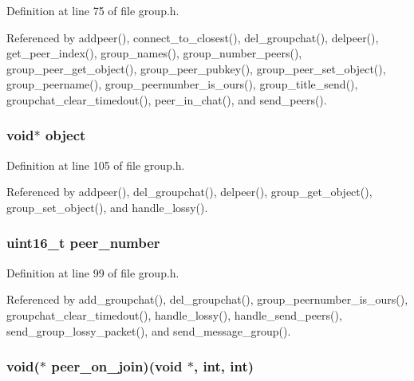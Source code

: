 Definition at line 75 of file group.\+h.



Referenced by addpeer(), connect\+\_\+to\+\_\+closest(), del\+\_\+groupchat(), delpeer(), get\+\_\+peer\+\_\+index(), group\+\_\+names(), group\+\_\+number\+\_\+peers(), group\+\_\+peer\+\_\+get\+\_\+object(), group\+\_\+peer\+\_\+pubkey(), group\+\_\+peer\+\_\+set\+\_\+object(), group\+\_\+peername(), group\+\_\+peernumber\+\_\+is\+\_\+ours(), group\+\_\+title\+\_\+send(), groupchat\+\_\+clear\+\_\+timedout(), peer\+\_\+in\+\_\+chat(), and send\+\_\+peers().

\hypertarget{struct_group__c_a077376d12464f945e2414d5499c79b3f}{
\subsubsection[{object}]{\setlength{\rightskip}{0pt plus 5cm}void$\ast$ object}}\label{struct_group__c_a077376d12464f945e2414d5499c79b3f}


Definition at line 105 of file group.\+h.



Referenced by addpeer(), del\+\_\+groupchat(), delpeer(), group\+\_\+get\+\_\+object(), group\+\_\+set\+\_\+object(), and handle\+\_\+lossy().

\hypertarget{struct_group__c_a264348ec1f724e05464ca97b7c432817}{
\subsubsection[{peer\+\_\+number}]{\setlength{\rightskip}{0pt plus 5cm}uint16\+\_\+t peer\+\_\+number}}\label{struct_group__c_a264348ec1f724e05464ca97b7c432817}


Definition at line 99 of file group.\+h.



Referenced by add\+\_\+groupchat(), del\+\_\+groupchat(), group\+\_\+peernumber\+\_\+is\+\_\+ours(), groupchat\+\_\+clear\+\_\+timedout(), handle\+\_\+lossy(), handle\+\_\+send\+\_\+peers(), send\+\_\+group\+\_\+lossy\+\_\+packet(), and send\+\_\+message\+\_\+group().

\hypertarget{struct_group__c_a218cd2e97bdb682b90f72faa6eb08576}{
\subsubsection[{peer\+\_\+on\+\_\+join}]{\setlength{\rightskip}{0pt plus 5cm}void($\ast$ peer\+\_\+on\+\_\+join)(void $\ast$, int, int)}}\label{struct_group__c_a218cd2e97bdb682b90f72faa6eb08576}


